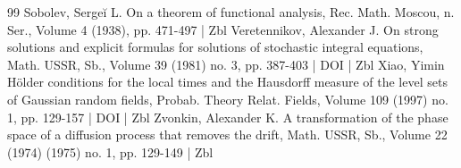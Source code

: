 \begin{thebibliography}{99}
Sobolev, Sergeĭ L. On a theorem of functional analysis, Rec. Math. Moscou, n. Ser., Volume 4 (1938), pp. 471-497 | Zbl
Veretennikov, Alexander J. On strong solutions and explicit formulas for solutions of stochastic integral equations, Math. USSR, Sb., Volume 39 (1981) no. 3, pp. 387-403 | DOI | Zbl
Xiao, Yimin Hölder conditions for the local times and the Hausdorff measure of the level sets of Gaussian random fields, Probab. Theory Relat. Fields, Volume 109 (1997) no. 1, pp. 129-157 | DOI | Zbl
Zvonkin, Alexander K. A transformation of the phase space of a diffusion process that removes the drift, Math. USSR, Sb., Volume 22 (1974) (1975) no. 1, pp. 129-149 | Zbl
\end{thebibliography}
